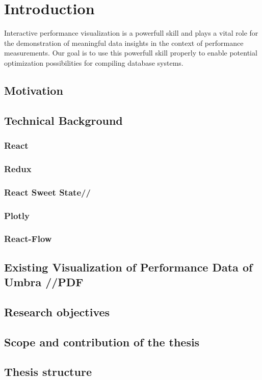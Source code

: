 
\chapter{Introduction}\label{chapter:introduction}
Interactive performance visualization is a powerfull skill and plays a vital role for the demonstration of meaningful data insights in the context of performance measurements. Our goal is to use this powerfull skill properly to enable potential optimization possibilities for compiling database systems.

\section{Motivation}
\section{Technical Background}
\subsection{React}
\subsection{Redux}
\subsection{React Sweet State//}
\subsection{Plotly}
\subsection{React-Flow}
\section{Existing Visualization of Performance Data of Umbra //PDF }
\section{Research objectives}
\section{Scope and contribution of the thesis}
\section{Thesis structure}

